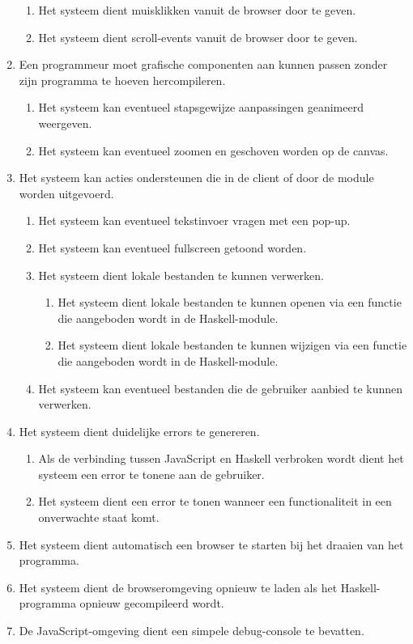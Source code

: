 \begin{enumerate}[{R}1]
\begin{enumerate}
		\item Het systeem dient muisklikken vanuit de browser door te geven.
		\item Het systeem dient scroll-events vanuit de browser door te geven.
	\end{enumerate}
	\item Een programmeur moet grafische componenten aan kunnen passen zonder zijn programma te hoeven hercompileren.
	\begin{enumerate}
		\item Het systeem kan eventueel stapsgewijze aanpassingen geanimeerd weergeven.
		\item Het systeem kan eventueel zoomen en geschoven worden op de canvas.
	\end{enumerate}
	\item Het systeem kan acties ondersteunen die in de client of door de module worden uitgevoerd.
	\begin{enumerate}
		\item Het systeem kan eventueel tekstinvoer vragen met een pop-up.
		\item Het systeem kan eventueel fullscreen getoond worden.
		\item Het systeem dient lokale bestanden te kunnen verwerken.
		\begin{enumerate}
			\item Het systeem dient lokale bestanden te kunnen openen via een functie die aangeboden wordt in de Haskell-module.
			\item Het systeem dient lokale bestanden te kunnen wijzigen via een functie die aangeboden wordt in de Haskell-module.
		\end{enumerate}
		
		\item Het systeem kan eventueel bestanden die de gebruiker aanbied te kunnen verwerken.
	\end{enumerate}
	\item Het systeem dient duidelijke errors te genereren.
	\begin{enumerate}
		\item Als de verbinding tussen JavaScript en Haskell verbroken wordt dient het systeem een error te tonene aan de gebruiker. 
		\item Het systeem dient een error te tonen wanneer een functionaliteit in een onverwachte staat komt.
	\end{enumerate}
	\item Het systeem dient automatisch een browser te starten bij het draaien van het programma.
	\item Het systeem dient de browseromgeving opnieuw te laden als het Haskell-programma opnieuw gecompileerd wordt.
	\item De JavaScript-omgeving dient een simpele debug-console te bevatten.
	\setcounter{startvalue}{\value{enumi}}
\end{enumerate}

